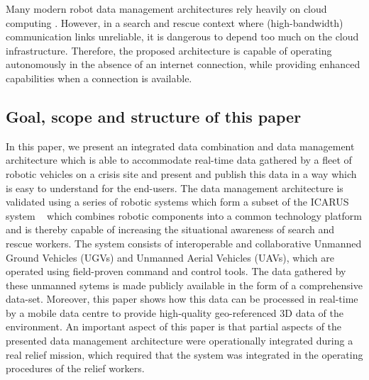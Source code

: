 \documentclass{article}
\begin{document}
Many modern robot data management architectures rely heavily on cloud computing \cite{Ermacora}. However, in a search and rescue context where (high-bandwidth) communication links unreliable, it is dangerous to depend too much on the cloud infrastructure. Therefore, the proposed architecture is capable of operating autonomously in the absence of an internet connection, while providing enhanced capabilities when a connection is available.

\subsection{Goal, scope and structure of this paper}
In this paper, we present an integrated data combination and data management architecture which is able to accommodate real-time data gathered by a fleet of robotic vehicles on a crisis site and present and publish this data in a way which is easy to understand for the end-users. The data management architecture is validated using a series of robotic systems which form a subset of the ICARUS system ~\cite{ICARUS} which combines robotic components into a common technology platform and is thereby capable of increasing the situational awareness of search and rescue workers.
The system consists of interoperable and collaborative Unmanned Ground Vehicles (UGVs) and Unmanned Aerial Vehicles (UAVs), which are operated using field-proven command and control tools. The data gathered by these unmanned sytems is made publicly available in the form of a comprehensive data-set. Moreover, this paper shows how this data can be processed in real-time by a mobile data centre to provide high-quality geo-referenced 3D data of the environment. An important aspect of this paper is that partial aspects of the presented data management architecture were operationally integrated during a real relief mission, which required that the system was integrated in the operating procedures of the relief workers.
\end{document}
